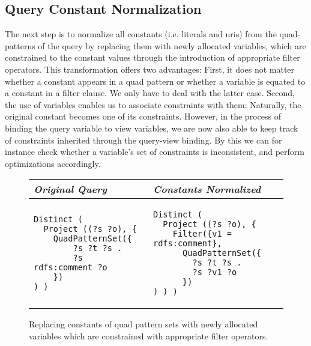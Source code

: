 \documentclass[a4paper,twoside,bibtotoc,abstracton,12pt,BCOR=15mm]{scrreprt}
\begin{document}
\subsection{Query Constant Normalization}
The next step is to normalize all constants (i.e. literals and uris) from the quad-patterns of the query by replacing them
with newly allocated variables, which are constrained to the constant values through the introduction of appropriate filter operators.
This transformation offers two advantages:
First, it does not matter whether a constant appears in a quad pattern or whether a variable is equated to a constant in a filter clause. We only have to deal with the latter case.
Second, the use of variables enables us to associate constraints with them: Naturally, the original constant becomes one of its constraints.
However, in the process of binding the query variable to view variables, we are now also able to keep track of constraints inherited through the query-view binding.
By this we can for instance check whether a variable's set of constraints is inconsistent, and perform optimizations accordingly.   
\begin{figure}[!h]
\centering
\begin{tabular}{ll}
\toprule
\emph{Original Query} & \emph{Constants Normalized} \\ 
\midrule

\begin{minipage}{6cm}
\begin{scriptsize}
\begin{verbatim}
Distinct (
  Project ((?s ?o), {
    QuadPatternSet({
        ?s ?t ?s .
        ?s rdfs:comment ?o
    })
) )
\end{verbatim}
\end{scriptsize}
\end{minipage}

&

\begin{minipage}{6cm}
\begin{scriptsize}
\begin{verbatim}
Distinct (
  Project ((?s ?o), {
    Filter({v1 = rdfs:comment},
      QuadPatternSet({
        ?s ?t ?s .
        ?s ?v1 ?o
      })
) ) )
\end{verbatim}
\end{scriptsize}
\end{minipage}

\\

\bottomrule
\end{tabular}
\caption{Replacing constants of quad pattern sets with newly allocated variables which are constrained with appropriate filter operators.}
\label{fig:constant-removal}
\end{figure}
\end{document}

